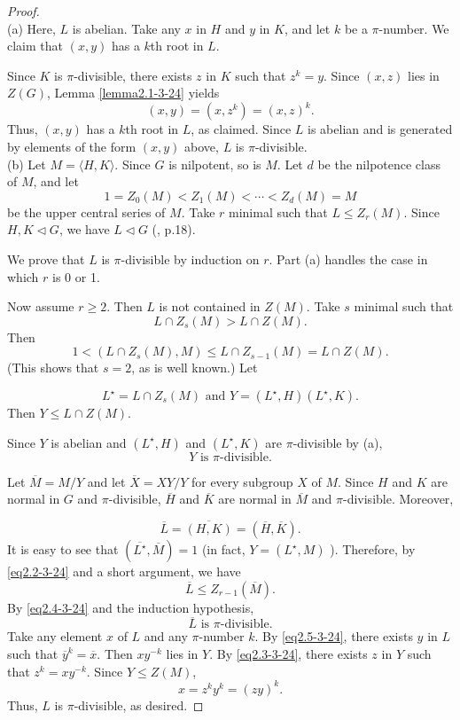 \documentclass[mathscr]{amsart}
\theoremstyle{theorem}
\theoremstyle{definition}
\numberwithin{equation}{section}
\def \({\left(}
\def \){\right)}
\begin{document}
\begin{proof}
\ \\
(a) Here, $L$ is abelian.  Take any $x$ in $H$ and $y$ in $K$, and
let $k$ be a $\pi$-number.  We claim that $(x,y)$ has a $k$th root
in $L$.

Since $K$ is $\pi$-divisible, there exists $z$ in $K$ such that
$z^k=y$. Since $(x,z)$ lies in $Z(G)$, Lemma \ref{lemma2.1-3-24}
yields
$$
(x,y)=\(x,z^k\)=(x,z)^k.
$$
Thus, $(x,y)$ has a $k$th root in $L$, as claimed. Since $L$ is
abelian and is generated by elements of the form $(x,y)$ above, $L$
is $\pi$-divisible.
\\

\noindent (b) Let $M=\langle H,K\rangle $.  Since $G$ is nilpotent,
so is $M$. Let $d$ be the nilpotence class of $M$, and let
$$
1=Z_0(M)<Z_1(M)<\cdots <Z_d(M)=M
$$
be the upper central series of $M$.  Take $r$ minimal such that
$L\leq Z_r (M)$. Since $H,K \lhd G$, we have $L\lhd G$ (\cite{Gor},
p.18).

We prove that $L$ is $\pi$-divisible by induction on $r$. Part (a)
handles the case in which $r$ is 0 or 1.

Now assume $r\geq 2$.  Then $L$ is not contained in $Z(M)$.  Take
$s$ minimal such that
$$
L\cap Z_s(M)>L\cap Z(M).
$$
Then
$$
1<\(L\cap Z_s(M),M\)\leq L\cap Z_{s-1}(M)=L\cap Z(M).
$$
(This shows that $s=2$, as is well known.)  Let

\begin{equation}\label{eq2.2-3-24}
L^\star =L\cap Z_s(M)\text{ and }Y=\(L^\star,H\)\(L^\star,K\).
\end{equation}
Then $Y\leq L\cap Z(M)$.

Since $Y$ is abelian and $\(L^\star,H\)$ and $\(L^\star,K\)$ are
$\pi$-divisible by (a),
\begin{equation}\label{eq2.3-3-24}
Y\text{ is }\pi\text{-divisible}.
\end{equation}

Let $\overline M=M/Y$ and let $\overline X=XY/Y$ for every subgroup
$X$ of $M$.  Since $H$ and $K$ are normal in $G$ and
$\pi$-divisible, $\overline H$ and $\overline K$ are normal in
$\overline M$ and $\pi$-divisible.   Moreover,

\begin{equation}
\overline L=\overline{(H,K)}=\(\overline H,\overline
K\).\label{eq2.4-3-24}
\end{equation}
It is easy to see that $\(\overline{L^\star},\overline M\)=1$ (in
fact, $Y=\(L^\star,M\)$ ).  Therefore, by \eqref{eq2.2-3-24} and a
short argument, we have
$$
\overline L\leq Z_{r-1}\(\overline M\).
$$
By \eqref{eq2.4-3-24} and the induction hypothesis,
\begin{equation}\label{eq2.5-3-24}
\overline L\text{ is }\pi\text{-divisible}.
\end{equation}
Take any element $x$ of $L$ and any $\pi$-number $k$.  By
\eqref{eq2.5-3-24}, there exists $y$ in $L$ such that $\overline
y^k=\overline x$.  Then $xy^{-k}$ lies in $Y$.  By
\eqref{eq2.3-3-24}, there exists $z$ in $Y$ such that $z^k=xy^{-k}$.
Since $Y\leq Z(M)$,
$$
x=z^ky^k=\(zy\)^k.
$$
Thus, $L$ is $\pi$-divisible, as desired.
\end{proof}
\end{document}
